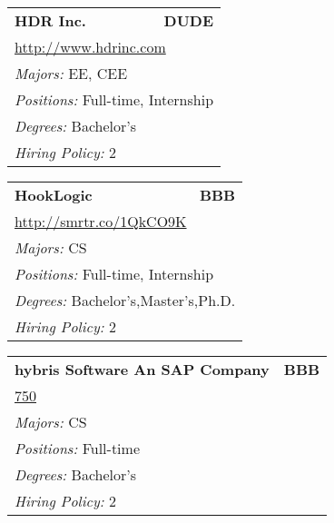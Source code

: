 \documentclass[twoside]{article}
\begin{document}
\begin{center}
\begin{multicols}{3}
\begin{FlushLeft}
\begin{minipage}{\columnwidth}
\end{minipage}
 
\begin{minipage}{\columnwidth}\begin{tabularx}{.95\columnwidth}{Xr}
                 {\Large\bf HDR Inc.} & {\Large\bf DUDE}\\
    \multicolumn{2}{p{.95\columnwidth}}{\url{http://www.hdrinc.com}}\\
    \multicolumn{2}{p{.95\columnwidth}}{\emph{Majors:} EE, CEE}\\
    \multicolumn{2}{p{.95\columnwidth}}{\emph{Positions:} Full-time, Internship}\\
    \multicolumn{2}{p{.95\columnwidth}}{\emph{Degrees:} Bachelor's}\\
    \multicolumn{2}{p{.95\columnwidth}}{\emph{Hiring Policy:} 2}\\
    \end{tabularx}
    
\end{minipage}
 
\begin{minipage}{\columnwidth}\begin{tabularx}{.95\columnwidth}{Xr}
                 {\Large\bf HookLogic} & {\Large\bf BBB}\\
    \multicolumn{2}{p{.95\columnwidth}}{\url{http://smrtr.co/1QkCO9K}}\\
    \multicolumn{2}{p{.95\columnwidth}}{\emph{Majors:} CS}\\
    \multicolumn{2}{p{.95\columnwidth}}{\emph{Positions:} Full-time, Internship}\\
    \multicolumn{2}{p{.95\columnwidth}}{\emph{Degrees:} Bachelor's,Master's,Ph.D.}\\
    \multicolumn{2}{p{.95\columnwidth}}{\emph{Hiring Policy:} 2}\\
    \end{tabularx}
    
\end{minipage}
 
\begin{minipage}{\columnwidth}\begin{tabularx}{.95\columnwidth}{Xr}
                 {\Large\bf hybris Software An SAP Company} & {\Large\bf BBB}\\
    \multicolumn{2}{p{.95\columnwidth}}{\url{750}}\\
    \multicolumn{2}{p{.95\columnwidth}}{\emph{Majors:} CS}\\
    \multicolumn{2}{p{.95\columnwidth}}{\emph{Positions:} Full-time}\\
    \multicolumn{2}{p{.95\columnwidth}}{\emph{Degrees:} Bachelor's}\\
    \multicolumn{2}{p{.95\columnwidth}}{\emph{Hiring Policy:} 2}\\
    \end{tabularx}
    

\end{minipage}
\end{FlushLeft}
\end{multicols}
\end{center}
\end{document}
